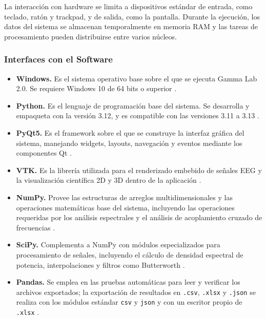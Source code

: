 \documentclass[12pt, letterpaper]{article}
\begin{document}
La interacción con hardware se limita a dispositivos estándar de entrada,
como teclado, ratón y trackpad, y de salida, como la pantalla. Durante la
ejecución, los datos del sistema se almacenan temporalmente en memoria RAM y
las tareas de procesamiento pueden distribuirse entre varios núcleos.

\subsubsection{Interfaces con el Software}

\begin{itemize}

    \item \textbf{Windows.} Es el sistema operativo base sobre el que se
    ejecuta Gamma Lab 2.0. Se requiere Windows 10 de 64 bits o superior
    \cite{ref1}.

    \item \textbf{Python.} Es el lenguaje de programación base del sistema.
    Se desarrolla y empaqueta con la versión 3.12, y es compatible con las
    versiones 3.11 a 3.13 \cite{ref2}.

    \item \textbf{PyQt5.} Es el framework sobre el que se construye la
    interfaz gráfica del sistema, manejando widgets, layouts, navegación y
    eventos mediante los componentes Qt \cite{ref3}.

    \item \textbf{VTK.} Es la librería utilizada para el renderizado
    embebido de señales EEG y la visualización científica 2D y 3D dentro de
    la aplicación \cite{ref4}.

    \item \textbf{NumPy.} Provee las estructuras de arreglos
    multidimensionales y las operaciones matemáticas base del sistema,
    incluyendo las operaciones requeridas por los análisis espectrales y el
    análisis de acoplamiento cruzado de frecuencias \cite{ref5}.

    \item \textbf{SciPy.} Complementa a NumPy con módulos especializados para
    procesamiento de señales, incluyendo el cálculo de densidad espectral de
    potencia, interpolaciones y filtros como Butterworth \cite{ref6}.

    \item \textbf{Pandas.} Se emplea en las pruebas automáticas para leer y
    verificar los archivos exportados; la exportación de resultados en
    \texttt{.csv}, \texttt{.xlsx} y \texttt{.json} se realiza con los módulos
    estándar \texttt{csv} y \texttt{json} y con un escritor propio de
    \texttt{.xlsx} \cite{ref7}.


\end{itemize}
\end{document}
